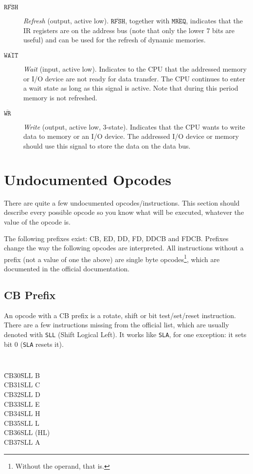 \documentclass[oneside,a4paper]{book}
\begin{document}
\begin{description}
\item[$\mathtt{\overline{RFSH}}$]
  {\em Refresh} (output, active low). $\mathtt{\overline{RFSH}}$, together
  with $\mathtt{\overline{MREQ}}$, indicates that the IR registers are on
  the address bus (note that only the lower 7 bits are useful) and can be 
  used for the refresh of dynamic memories.

\item[$\mathtt{\overline{WAIT}}$]
  {\em Wait} (input, active low). Indicates to the CPU that the addressed
  memory or I/O device are not ready for data transfer. The CPU continues
  to enter a wait state as long as this signal is active. Note that during
  this period memory is not refreshed.

\item[$\mathtt{\overline{WR}}$]
  {\em Write} (output, active low, 3-state). Indicates that the 
  CPU wants to write data to memory or an I/O device. The addressed I/O device
  or memory should use this signal to store the data on the data bus.

\end{description}


\chapter{Undocumented Opcodes}

There are quite a few undocumented opcodes/instructions. This section 
should describe every possible opcode so you know what will be executed, 
whatever the value of the opcode is.

The following prefixes exist: CB, ED, DD, FD, DDCB and FDCB. Prefixes change 
the way the following opcodes are interpreted. All instructions without a 
prefix (not a value of one the above) are single byte opcodes\footnote{
Without the operand, that is.}, which are documented in the official 
documentation.


\section{CB Prefix \cite{gerton}}
\label{prefix_cb}

An opcode with a CB prefix is a rotate, shift or bit test/set/reset 
instruction. There are a few instructions missing from the official list, 
which are usually denoted with {\tt SLL} (Shift Logical Left). It works like 
{\tt SLA}, for one exception: it sets bit 0 ({\tt SLA} resets it).

{\tt
  \begin{tabbing}
    {\qquad}\=CB30\qquad\=SLL B \+\\
       CB31\>SLL C\\
       CB32\>SLL D\\
       CB33\>SLL E\\
       CB34\>SLL H\\
       CB35\>SLL L\\
       CB36\>SLL (HL)\\
       CB37\>SLL A
\end{tabbing}
}
\end{document}
